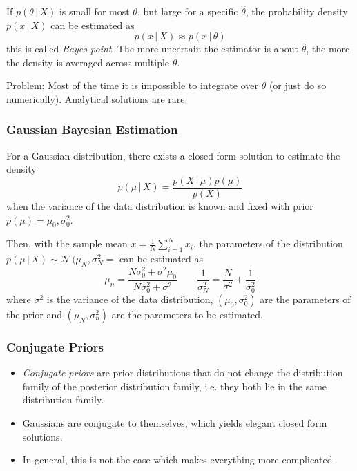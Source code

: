 \documentclass[a4paper, 11pt, accentcolor = tud3b]{tudreport}
\newcommand{\given}{\ensuremath{\,\vert\,}}
\begin{document}
				If \( p(\theta \given X) \) is small for most \(\theta\), but large for a specific \( \hat{\theta} \), the probability density \( p(x \given X) \) can be estimated as
				\begin{equation}
					p(x \given X) \approx p(x \given \theta)
				\end{equation}
				this is called \emph{Bayes point}. The more uncertain the estimator is about \( \hat{\theta} \), the more the density is averaged across multiple \(\theta\).

				Problem: Most of the time it is impossible to integrate over \(\theta\) (or just do so numerically). Analytical solutions are rare.

				\subsubsection{Gaussian Bayesian Estimation}
					For a Gaussian distribution, there exists a closed form solution to estimate the density
					\begin{equation}
						p(\mu \given X) = \frac{p(X \given \mu) p(\mu)}{p(X)}
					\end{equation}
					when the variance of the data distribution is known and fixed with prior \( p(\mu) = \mathcal{\mu_0, \sigma_0^2} \).

					Then, with the sample mean \( \bar{x} = \frac{1}{N} \sum_{i = 1}^{N} x_i \), the parameters of the distribution \( p(\mu \given X) \sim \mathcal{N}\,(\mu_N, \sigma_N^2= \) can be estimated as
					\begin{equation}
						\mu_n = \frac{N\sigma_0^2 + \sigma^2 \mu_0}{N\sigma_0^2 + \sigma^2} \qquad \frac{1}{\sigma_N^2} = \frac{N}{\sigma^2} + \frac{1}{\sigma_0^2}
					\end{equation}
					where \(\sigma^2\) is the variance of the data distribution, \( (\mu_0, \sigma_0^2) \) are the parameters of the prior and \( (\mu_N, \sigma_n^2) \) are the parameters to be estimated.

			\subsubsection{Conjugate Priors}
				\begin{itemize}
					\item \emph{Conjugate priors} are prior distributions that do not change the distribution family of the posterior distribution family, i.e. they both lie in the same distribution family.
					\item Gaussians are conjugate to themselves, which yields elegant closed form solutions.
					\item In general, this is not the case which makes everything more complicated.
				\end{itemize}
\end{document}
